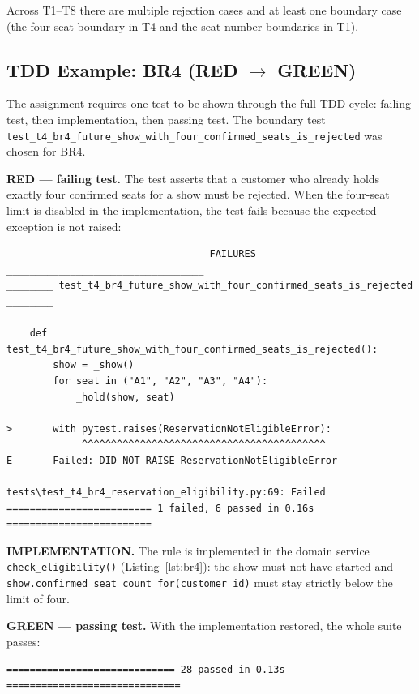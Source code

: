 \documentclass[11pt,a4paper]{article}
\newcommand{\code}[1]{\texttt{#1}}
\begin{document}
Across T1--T8 there are multiple rejection cases and at least one boundary case
(the four-seat boundary in T4 and the seat-number boundaries in T1).

\subsection{TDD Example: BR4 (RED $\rightarrow$ GREEN)}

The assignment requires one test to be shown through the full TDD cycle:
failing test, then implementation, then passing test. The boundary test
\code{test\_t4\_br4\_future\_show\_with\_four\_confirmed\_seats\_is\_rejected}
was chosen for BR4.

\textbf{RED --- failing test.} The test asserts that a customer who already
holds exactly four confirmed seats for a show must be rejected. When the
four-seat limit is disabled in the implementation, the test fails because the
expected exception is not raised:

\begin{lstlisting}[style=shell,caption={RED evidence (excerpt) --- the test fails when the rule is removed.},label=lst:red]
__________________________________ FAILURES __________________________________
________ test_t4_br4_future_show_with_four_confirmed_seats_is_rejected ________

    def test_t4_br4_future_show_with_four_confirmed_seats_is_rejected():
        show = _show()
        for seat in ("A1", "A2", "A3", "A4"):
            _hold(show, seat)

>       with pytest.raises(ReservationNotEligibleError):
             ^^^^^^^^^^^^^^^^^^^^^^^^^^^^^^^^^^^^^^^^^^
E       Failed: DID NOT RAISE ReservationNotEligibleError

tests\test_t4_br4_reservation_eligibility.py:69: Failed
========================= 1 failed, 6 passed in 0.16s =========================
\end{lstlisting}

\textbf{IMPLEMENTATION.} The rule is implemented in the domain service
\code{check\_eligibility()} (Listing~\ref{lst:br4}): the show must not have
started and \code{show.confirmed\_seat\_count\_for(customer\_id)} must stay
strictly below the limit of four.

\textbf{GREEN --- passing test.} With the implementation restored, the whole
suite passes:

\begin{lstlisting}[style=shell,caption={GREEN evidence --- full suite result.},label=lst:green]
============================= 28 passed in 0.13s ==============================
\end{lstlisting}
\end{document}
